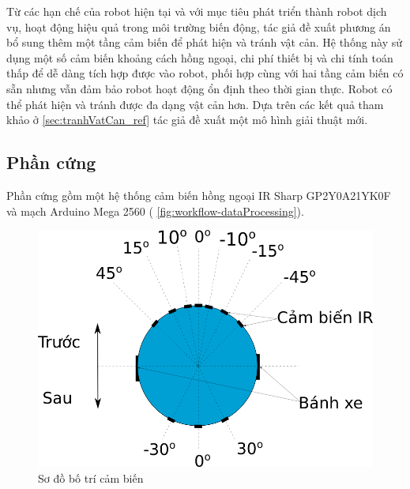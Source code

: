 Từ các hạn chế của robot hiện tại và với mục tiêu phát triển thành robot dịch vụ, hoạt động hiệu quả trong môi trường biến động, tác giả đề xuất phương án bổ sung thêm một tầng cảm biến để phát hiện và tránh vật cản. Hệ thống này sử dụng một số cảm biến khoảng cách hồng ngoại, chi phí thiết bị và chi tính toán thấp để dễ dàng tích hợp được vào robot, phối hợp cùng với hai tầng cảm biến có sẵn nhưng vẫn đảm bảo robot hoạt động ổn định theo thời gian thực. Robot có thể phát hiện và tránh được đa dạng vật cản hơn. Dựa trên các kết quả tham khảo ở \ref{sec:tranhVatCan_ref} tác giả đề xuất một mô hình giải thuật mới.


\subsection{Phần cứng}


Phần cứng gồm một hệ thống cảm biến hồng ngoại IR Sharp GP2Y0A21YK0F và mạch Arduino Mega 2560 (\figurename{ \ref{fig:workflow-dataProcessing}}).

\begin{figure}[htbp]
	\centering
	\includegraphics[width=0.7\linewidth]{figures/IR_layout.png}
	\caption{Sơ đồ bố trí cảm biến}
	\label{fig:IR_layout.png}
\end{figure}

